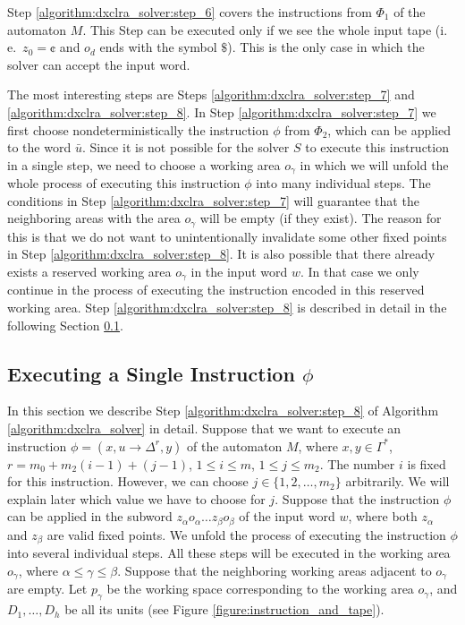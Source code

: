 Step \ref{algorithm:dxclra_solver:step_6} covers the instructions from $\Phi_1$ of the automaton $M$. This Step can be executed only if we see the whole input tape (i.\,e.\ $z_0 = \cent$ and $o_d$ ends with the symbol $\$$). This is the only case in which the solver can accept the input word.

The most interesting steps are Steps \ref{algorithm:dxclra_solver:step_7} and \ref{algorithm:dxclra_solver:step_8}. In Step \ref{algorithm:dxclra_solver:step_7} we first choose nondeterministically the instruction $\phi$ from $\Phi_2$, which can be applied to the word $\bar{u}$. Since it is not possible for the solver $S$ to execute this instruction in a single step, we need to choose a working area $o_{\gamma}$ in which we will unfold the whole process of executing this instruction $\phi$ into many individual steps. The conditions in Step \ref{algorithm:dxclra_solver:step_7} will guarantee that the neighboring areas with the area $o_{\gamma}$ will be empty (if they exist). The reason for this is that we do not want to unintentionally invalidate some other fixed points in Step \ref{algorithm:dxclra_solver:step_8}. It is also possible that there already exists a reserved working area $o_{\gamma}$ in the input word $w$. In that case we only continue in the process of executing the instruction encoded in this reserved working area. Step \ref{algorithm:dxclra_solver:step_8} is described in detail in the following Section \ref{section:dxclra_instruction}.

\subsection{Executing a Single Instruction $\phi$}\label{section:dxclra_instruction}

In this section we describe Step \ref{algorithm:dxclra_solver:step_8} of Algorithm \ref{algorithm:dxclra_solver} in detail. Suppose that we want to execute an instruction $\phi = (x, u \to \Delta^r, y)$ of the automaton $M$, where $x, y \in \Gamma^*$, $r = m_0 + m_2 (i - 1) + (j - 1)$, $1 \le i \le m$, $1 \le j \le m_2$. The number $i$ is fixed for this instruction. However, we can choose $j \in \{1, 2, \ldots, m_2\}$ arbitrarily. We will explain later which value we have to choose for $j$. Suppose that the instruction $\phi$ can be applied in the subword $z_{\alpha} o_{\alpha} \ldots z_{\beta} o_{\beta}$ of the input word $w$, where both  $z_{\alpha}$ and $z_{\beta}$ are valid fixed points. We unfold the process of executing the instruction $\phi$ into several individual steps. All these steps will be executed in the working area $o_{\gamma}$, where $\alpha \le \gamma \le \beta$. Suppose that the neighboring working areas adjacent to $o_{\gamma}$ are empty. Let $p_{\gamma}$ be the working space corresponding to the working area $o_{\gamma}$, and $D_1, \ldots, D_h$ be all its units (see Figure \ref{figure:instruction_and_tape}).

